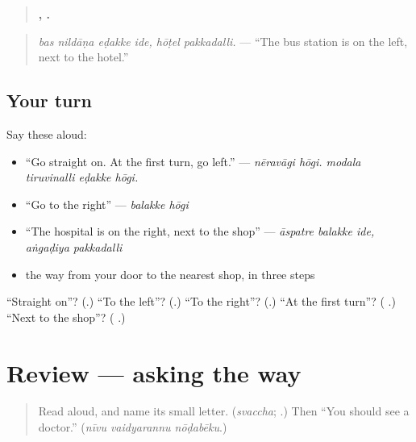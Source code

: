 \begin{quote}
\textbf{   ,  .}
\end{quote}

\begin{quote}
\emph{bas nildāṇa eḍakke ide, hōṭel pakkadalli.} — \textquotedblleft{}The bus station is on the left, next to the hotel.\textquotedblright{}
\end{quote}

\subsection*{Your turn}
Say these aloud:

\begin{itemize}
\raggedright
  \item \textquotedblleft{}Go straight on. At the first turn, go left.\textquotedblright{} — \emph{nēravāgi hōgi. modala tiruvinalli eḍakke hōgi.}
  \item \textquotedblleft{}Go to the right\textquotedblright{} — \emph{balakke hōgi}
  \item \textquotedblleft{}The hospital is on the right, next to the shop\textquotedblright{} — \emph{āspatre balakke ide, aṅgaḍiya pakkadalli}
  \item the way from your door to the nearest shop, in three steps
\end{itemize}

\begin{tcolorbox}[breakable,colback=teal!4,colframe=teal!35!black,title={Before you move on}]
\textquotedblleft{}Straight on\textquotedblright{}? (\textbf{}.) \textquotedblleft{}To the left\textquotedblright{}? (\textbf{}.) \textquotedblleft{}To the right\textquotedblright{}? (\textbf{}.) \textquotedblleft{}At the first turn\textquotedblright{}? (\textbf{ }.) \textquotedblleft{}Next to the shop\textquotedblright{}? (\textbf{ }.)
\end{tcolorbox}
\section[(review)]{Review — asking the way}

\label{lesson:KA-R313-asking-the-way}



\begin{quote}
Read \textbf{} aloud, and name its small letter. (\emph{svaccha}; \textbf{}.) Then \textquotedblleft{}You should see a doctor.\textquotedblright{} (\emph{nīvu vaidyarannu nōḍabēku}.)
\end{quote}

